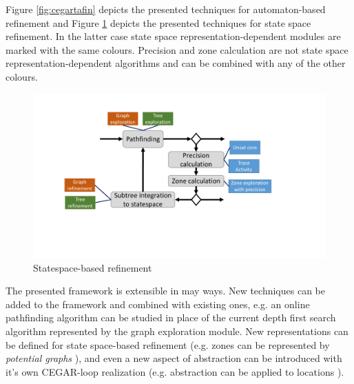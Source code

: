 Figure \ref{fig:cegartafin} depicts the presented techniques for automaton-based refinement and Figure \ref{fig:cegarsspfin} depicts the presented techniques for state space refinement. In the latter case state space representation-dependent modules are marked with the same colours. Precision and zone calculation are not state space representation-dependent algorithms and can be combined with any of the other colours.

\begin{figure}[h]
	\centering
	\includegraphics[width=.9\textwidth]{include/figures/cegar_ssp_complete}
	\caption{Statespace-based refinement}
	\label{fig:cegarsspfin}
\end{figure}

The presented framework is extensible in may ways. New techniques can be added to the framework and combined with existing ones, e.g. an online pathfinding algorithm can be studied in place of the current depth first search algorithm represented by the graph exploration module. New representations can be defined for state space-based refinement (e.g. zones can be represented by \emph{potential graphs} \cite{conf/sas/GangeNSSS16}), and even a new aspect of abstraction can be introduced with it's own CEGAR-loop realization (e.g. abstraction can be applied to locations \cite{kemper2007sat}).




